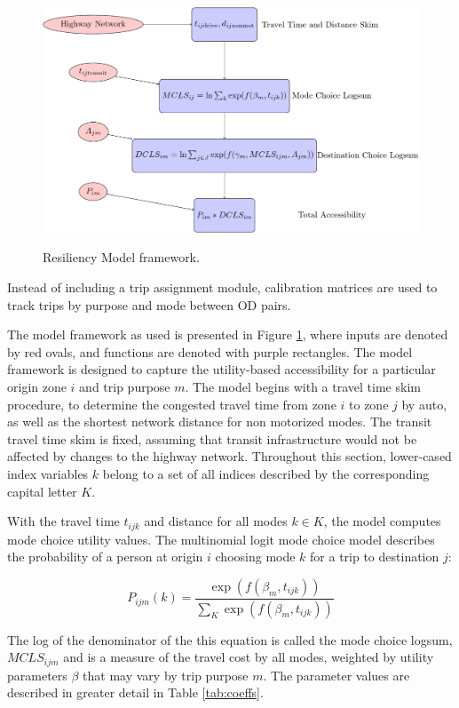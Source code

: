   \begin{figure}
    \centering
  {\includegraphics[width=0.75\linewidth]{figures/chapter3/framework.png}}
  \caption{Resiliency Model framework.}\label{fig:framework}

  \end{figure}

\noindent Instead of including a trip assignment module, calibration
matrices are used to track trips by purpose and mode between OD pairs.

The model framework as used is presented in Figure \ref{fig:framework}, where
inputs are denoted by red ovals, and functions are denoted with purple rectangles.
The model framework is designed to capture the utility-based accessibility for
a particular origin zone \(i\) and trip purpose \(m\). The model begins with a
travel time skim procedure, to determine the congested travel time from zone
\(i\) to zone \(j\) by auto, as well as the shortest network distance for non
motorized modes. The transit travel time skim is fixed, assuming that transit
infrastructure would not be affected by changes to the highway network.
Throughout this section, lower-cased index variables \(k\) belong to a set of
all indices described by the corresponding capital letter \(K\).

With the travel time \(t_{ijk}\) and distance for all modes \(k \in K\), the model computes mode choice utility values. The multinomial logit mode choice model describes the probability of a person at origin \(i\) choosing mode \(k\) for a trip to destination \(j\):

\begin{equation}
{P}_{ijm}(k) = \frac{\exp(f(\beta_{m},
t_{ijk}))}{\sum_{K}\exp(f(\beta_{m}, t_{ijk}))}
  \label{eq:mcp}
\end{equation}

\noindent The log of the denominator of the this equation is called the
mode choice logsum, \(MCLS_{ijm}\) and is a measure of the travel cost by
all modes, weighted by utility parameters \(\beta\) that may vary by
trip purpose $m$. The parameter values are described in greater detail in Table \ref{tab:coeffs}.

